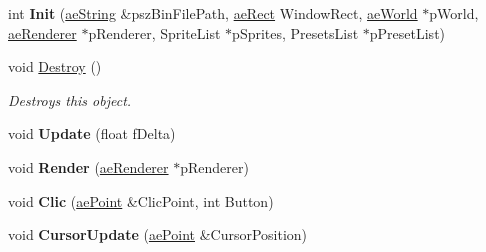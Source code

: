 \begin{DoxyCompactItemize}
\item 
int {\bfseries Init} (\hyperlink{namespaceae_core_ad6f85aacc0d1fdd85e458e2413e60010}{ae\+String} \&psz\+Bin\+File\+Path, \hyperlink{structae_core_1_1ae_rect}{ae\+Rect} Window\+Rect, \hyperlink{classae_world}{ae\+World} $\ast$p\+World, \hyperlink{classae_core_1_1ae_renderer}{ae\+Renderer} $\ast$p\+Renderer, Sprite\+List $\ast$p\+Sprites, Presets\+List $\ast$p\+Preset\+List)\hypertarget{classae_g_u_i_ab93bb1ad114e5e38d4670fddae1d196c}{}\label{classae_g_u_i_ab93bb1ad114e5e38d4670fddae1d196c}

\item 
void \hyperlink{classae_g_u_i_a0d16a8ff7acc7d761c2ed09519a2752a}{Destroy} ()\hypertarget{classae_g_u_i_a0d16a8ff7acc7d761c2ed09519a2752a}{}\label{classae_g_u_i_a0d16a8ff7acc7d761c2ed09519a2752a}

\begin{DoxyCompactList}\small\item\em Destroys this object. \end{DoxyCompactList}\item 
void {\bfseries Update} (float f\+Delta)\hypertarget{classae_g_u_i_a6c65652942ea9ca77011978d6e70829e}{}\label{classae_g_u_i_a6c65652942ea9ca77011978d6e70829e}

\item 
void {\bfseries Render} (\hyperlink{classae_core_1_1ae_renderer}{ae\+Renderer} $\ast$p\+Renderer)\hypertarget{classae_g_u_i_a86c3623ba59bcc11ac73be0680dea4aa}{}\label{classae_g_u_i_a86c3623ba59bcc11ac73be0680dea4aa}

\item 
void {\bfseries Clic} (\hyperlink{structae_core_1_1ae_point}{ae\+Point} \&Clic\+Point, int Button)\hypertarget{classae_g_u_i_a192020f55f163615c0a2b8587e01b012}{}\label{classae_g_u_i_a192020f55f163615c0a2b8587e01b012}

\item 
void {\bfseries Cursor\+Update} (\hyperlink{structae_core_1_1ae_point}{ae\+Point} \&Cursor\+Position)\hypertarget{classae_g_u_i_adb072cf128f11ea0f2f3495feb753b42}{}\label{classae_g_u_i_adb072cf128f11ea0f2f3495feb753b42}

\end{DoxyCompactItemize}
